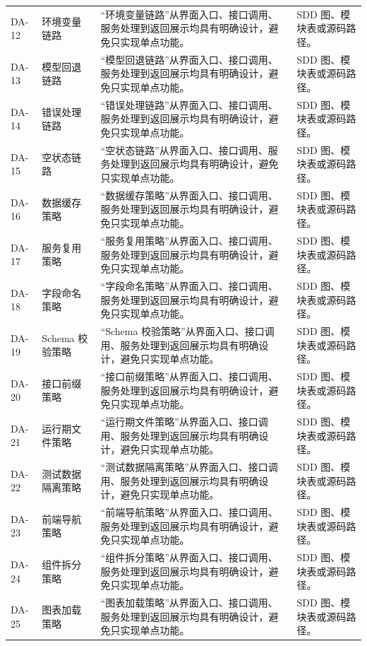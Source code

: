 \documentclass[12pt,a4paper]{ctexart}
\begin{document}
\begin{longtable}{L{1.7cm}L{4.0cm}L{6.2cm}L{3.6cm}}
DA-12 & 环境变量链路 & “环境变量链路”从界面入口、接口调用、服务处理到返回展示均具有明确设计，避免只实现单点功能。 & SDD 图、模块表或源码路径。 \\
DA-13 & 模型回退链路 & “模型回退链路”从界面入口、接口调用、服务处理到返回展示均具有明确设计，避免只实现单点功能。 & SDD 图、模块表或源码路径。 \\
DA-14 & 错误处理链路 & “错误处理链路”从界面入口、接口调用、服务处理到返回展示均具有明确设计，避免只实现单点功能。 & SDD 图、模块表或源码路径。 \\
DA-15 & 空状态链路 & “空状态链路”从界面入口、接口调用、服务处理到返回展示均具有明确设计，避免只实现单点功能。 & SDD 图、模块表或源码路径。 \\
DA-16 & 数据缓存策略 & “数据缓存策略”从界面入口、接口调用、服务处理到返回展示均具有明确设计，避免只实现单点功能。 & SDD 图、模块表或源码路径。 \\
DA-17 & 服务复用策略 & “服务复用策略”从界面入口、接口调用、服务处理到返回展示均具有明确设计，避免只实现单点功能。 & SDD 图、模块表或源码路径。 \\
DA-18 & 字段命名策略 & “字段命名策略”从界面入口、接口调用、服务处理到返回展示均具有明确设计，避免只实现单点功能。 & SDD 图、模块表或源码路径。 \\
DA-19 & Schema 校验策略 & “Schema 校验策略”从界面入口、接口调用、服务处理到返回展示均具有明确设计，避免只实现单点功能。 & SDD 图、模块表或源码路径。 \\
DA-20 & 接口前缀策略 & “接口前缀策略”从界面入口、接口调用、服务处理到返回展示均具有明确设计，避免只实现单点功能。 & SDD 图、模块表或源码路径。 \\
DA-21 & 运行期文件策略 & “运行期文件策略”从界面入口、接口调用、服务处理到返回展示均具有明确设计，避免只实现单点功能。 & SDD 图、模块表或源码路径。 \\
DA-22 & 测试数据隔离策略 & “测试数据隔离策略”从界面入口、接口调用、服务处理到返回展示均具有明确设计，避免只实现单点功能。 & SDD 图、模块表或源码路径。 \\
DA-23 & 前端导航策略 & “前端导航策略”从界面入口、接口调用、服务处理到返回展示均具有明确设计，避免只实现单点功能。 & SDD 图、模块表或源码路径。 \\
DA-24 & 组件拆分策略 & “组件拆分策略”从界面入口、接口调用、服务处理到返回展示均具有明确设计，避免只实现单点功能。 & SDD 图、模块表或源码路径。 \\
DA-25 & 图表加载策略 & “图表加载策略”从界面入口、接口调用、服务处理到返回展示均具有明确设计，避免只实现单点功能。 & SDD 图、模块表或源码路径。 \\

\end{longtable}
\end{document}
